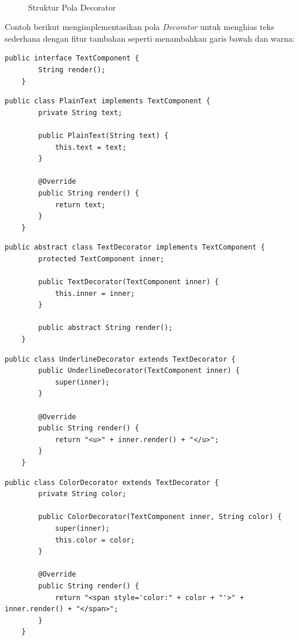 \begin{figure}[h]
	\centering
	\includegraphics[width=0\textwidth]{../figures/out/decorator.png}
	\caption{Struktur Pola Decorator}
	\label{fig:decorator}
\end{figure}

Contoh berikut mengimplementasikan pola \textit{Decorator} untuk menghias teks sederhana dengan fitur tambahan seperti menambahkan garis bawah dan warna:

\begin{lstlisting}[style=JavaStyle, caption={Komponen Dasar: TextComponent}, label={lst:decorator-component}]
	public interface TextComponent {
		String render();
	}
\end{lstlisting}

\begin{lstlisting}[style=JavaStyle, caption={Komponen Konkret: PlainText}, label={lst:decorator-plaintext}]
	public class PlainText implements TextComponent {
		private String text;
		
		public PlainText(String text) {
			this.text = text;
		}
		
		@Override
		public String render() {
			return text;
		}
	}
\end{lstlisting}

\begin{lstlisting}[style=JavaStyle, caption={Decorator Abstrak: TextDecorator}, label={lst:decorator-decorator}]
	public abstract class TextDecorator implements TextComponent {
		protected TextComponent inner;
		
		public TextDecorator(TextComponent inner) {
			this.inner = inner;
		}
		
		public abstract String render();
	}
\end{lstlisting}

\begin{lstlisting}[style=JavaStyle, caption={Decorator Konkret: UnderlineDecorator}, label={lst:decorator-underline}]
	public class UnderlineDecorator extends TextDecorator {
		public UnderlineDecorator(TextComponent inner) {
			super(inner);
		}
		
		@Override
		public String render() {
			return "<u>" + inner.render() + "</u>";
		}
	}
\end{lstlisting}

\begin{lstlisting}[style=JavaStyle, caption={Decorator Konkret: ColorDecorator}, label={lst:decorator-color}]
	public class ColorDecorator extends TextDecorator {
		private String color;
		
		public ColorDecorator(TextComponent inner, String color) {
			super(inner);
			this.color = color;
		}
		
		@Override
		public String render() {
			return "<span style='color:" + color + "'>" + inner.render() + "</span>";
		}
	}
\end{lstlisting}

